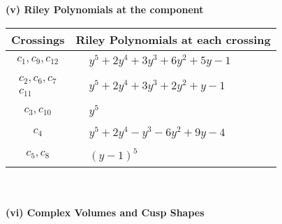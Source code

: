 \documentclass[1p]{elsarticle_modified}
\theoremstyle{definition}
\begin{document}
\newpage\renewcommand{\arraystretch}{1}
\flushleft \textbf{(v) Riley Polynomials at the component}\newline \\
\begin{tabular}{m{50pt}|m{274pt}}
Crossings & \hspace{64pt}Riley Polynomials at each crossing \\
\hline $$\begin{aligned}c_{1},c_{9},c_{12}\end{aligned}$$&$\begin{aligned}
&y^5+2 y^4+3 y^3+6 y^2+5 y-1
\end{aligned}$\\
\hline $$\begin{aligned}c_{2},c_{6},c_{7}\\c_{11}\end{aligned}$$&$\begin{aligned}
&y^5+2 y^4+3 y^3+2 y^2+y-1
\end{aligned}$\\
\hline $$\begin{aligned}c_{3},c_{10}\end{aligned}$$&$\begin{aligned}
&y^5
\end{aligned}$\\
\hline $$\begin{aligned}c_{4}\end{aligned}$$&$\begin{aligned}
&y^5+2 y^4- y^3-6 y^2+9 y-4
\end{aligned}$\\
\hline $$\begin{aligned}c_{5},c_{8}\end{aligned}$$&$\begin{aligned}
&(y-1)^5
\end{aligned}$\\
\hline
\end{tabular}\\~\\
\newpage\flushleft \textbf{(vi) Complex Volumes and Cusp Shapes}
\end{document}
